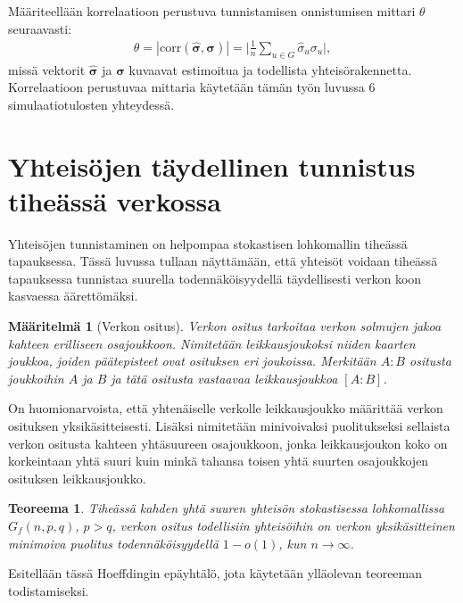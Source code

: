 \documentclass[finnish,12pt,a4paper,pdftex,sci,utf8]{aaltothesis}
\newtheorem{teoreema}{Teoreema}
\newtheorem{definition}{Määritelmä}
\begin{document}
Määriteellään korrelaatioon perustuva tunnistamisen onnistumisen mittari $\theta$ seuraavasti:
\begin{align*}
	\theta = \left| \text{corr}(\mathbf{\hat{{\sigma}}}, \mathbf{\sigma}) \right| = \lvert \frac{1}{n} \sum_{u\in G} \hat{\sigma}_u \sigma_u \rvert,
\end{align*}
missä vektorit $\hat{\mathbf{\sigma}}$ ja $\mathbf{\sigma}$ kuvaavat estimoitua ja todellista yhteisörakennetta.
Korrelaatioon perustuvaa mittaria käytetään tämän työn luvussa 6 simulaatiotulosten yhteydessä.

\clearpage

\section{Yhteisöjen täydellinen tunnistus tiheässä verkossa}
Yhteisöjen tunnistaminen on helpompaa stokastisen lohkomallin tiheässä tapauksessa. Tässä luvussa tullaan näyttämään, että yhteisöt voidaan tiheässä tapauksessa tunnistaa suurella todennäköisyydellä täydellisesti verkon koon kasvaessa äärettömäksi.

\begin{definition}[Verkon ositus]
	Verkon ositus tarkoitaa verkon solmujen jakoa kahteen erilliseen osajoukkoon. Nimitetään leikkausjoukoksi niiden kaarten joukkoa, joiden päätepisteet ovat osituksen eri joukoissa. Merkitään $A:B$ ositusta joukkoihin $A$ ja $B$ ja tätä ositusta vastaavaa leikkausjoukkoa $[A:B]$.
\end{definition}

On huomionarvoista, että yhtenäiselle verkolle leikkausjoukko määrittää verkon osituksen yksikäsitteisesti. Lisäksi nimitetään minivoivaksi puolitukseksi sellaista verkon ositusta kahteen yhtäsuureen osajoukkoon, jonka leikkausjoukon koko on korkeintaan yhtä suuri kuin minkä tahansa toisen yhtä suurten osajoukkojen osituksen leikkausjoukko.

\begin{teoreema}
	\label{teoreema:mincut}
	Tiheässä kahden yhtä suuren yhteisön stokastisessa lohkomallissa $G_f(n,p,q)$, $p > q$, verkon ositus todellisiin yhteisöihin on verkon yksikäsitteinen minimoiva puolitus todennäköisyydellä $1-o(1)$, kun $n \rightarrow \infty$.
\end{teoreema}

Esitellään tässä Hoeffdingin epäyhtälö, jota käytetään ylläolevan teoreeman todistamiseksi.
\end{document}
